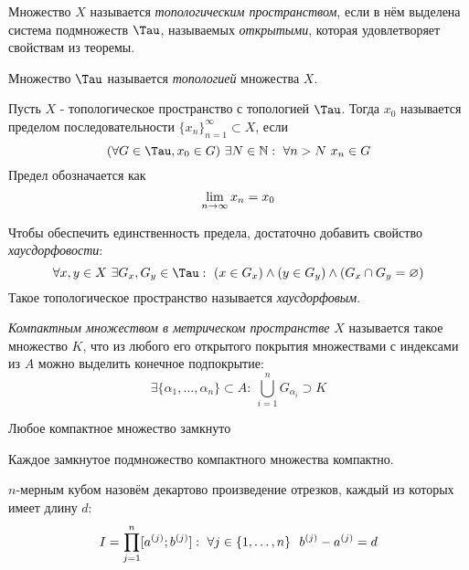 \begin{multicols}{2}
    
    \begin{definition}{}{}
        Множество $X$ называется \textit{топологическим пространством}, если в нём выделена система подмножеств $\Tau$, называемых \textit{открытыми}, которая удовлетворяет свойствам из теоремы.
        
        Множество $\Tau$ называется \textit{топологией} множества $X$.
    \end{definition}
    
    \begin{definition}{}{}
        Пусть $X$ - топологическое пространство с топологией $\Tau$. Тогда $x_0$ называется пределом последовательности $\{x_n\}_{n = 1}^\infty \subset X$, если
        \[
            (\forall G \in \Tau, x_0 \in G)\ \exists N \in \N : \  \forall n > N\ x_n \in G
        \]
        Предел обозначается как
        \[
            \lim\limits_{n \to \infty} x_n = x_0
        \]
    \end{definition}

    \begin{note}{}{}
        Чтобы обеспечить единственность предела, достаточно добавить свойство \textit{хаусдорфовости}:
        \[
            \forall x, y \in X\ \exists G_x, G_y \in \Tau : \  (x \in G_x) \wedge (y \in G_y) \wedge (G_x \cap G_y = \emptyset)
        \]
        Такое топологическое пространство называется \textit{хаусдорфовым}.
    \end{note}

    \begin{definition}{}{}
        \textit{Компактным множеством в метрическом пространстве} $X$ называется такое множество $K$, что из любого его открытого покрытия множествами с индексами из $A$ можно выделить конечное подпокрытие:
        \[
            \exists \{\alpha_1, \ldots, \alpha_n\} \subset A :\  \bigcup_{i = 1}^n G_{\alpha_i} \supset K
        \]
    \end{definition}
    
    \begin{theorema}{}{}
        Любое компактное множество замкнуто
    \end{theorema}
    
    \begin{theorema}{}{}
        Каждое замкнутое подмножество компактного множества компактно.
    \end{theorema}
    
    
    \begin{definition}{}{}
        $n$-мерным кубом назовём декартово произведение отрезков, каждый из которых имеет длину $d$:
        \[
            I = \prod\limits_{j = 1}^n [a^{(j)}; b^{(j)}] :\  \forall j \in \{1, \ldots, n\}\ \ b^{(j)} - a^{(j)} = d
        \]
    \end{definition}
    

\end{multicols}
